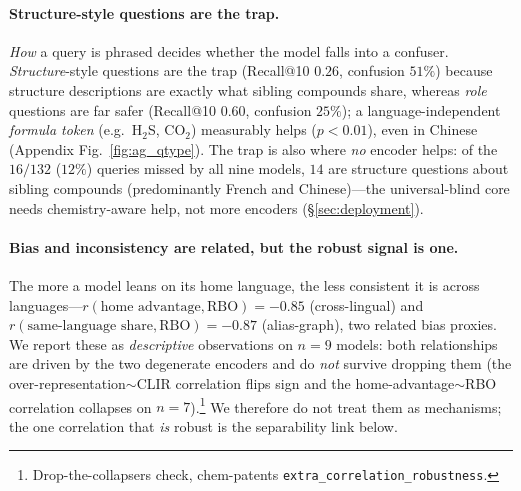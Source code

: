 \documentclass[11pt]{article}
\begin{document}
\paragraph{Structure-style questions are the trap.}
\emph{How} a query is phrased decides whether the model falls into a confuser.
\emph{Structure}-style questions are the trap (Recall@10 $0.26$, confusion
$51\%$) because structure descriptions are exactly what sibling compounds
share, whereas \emph{role} questions are far safer (Recall@10 $0.60$, confusion
$25\%$); a language-independent \emph{formula token} (e.g.\ H$_2$S, CO$_2$)
measurably helps ($p<0.01$), even in Chinese (Appendix Fig.~\ref{fig:ag_qtype}). The
trap is also where \emph{no} encoder helps: of the $16/132$ ($12\%$) queries
missed by all nine models, $14$ are structure questions about sibling compounds
(predominantly French and Chinese)---the universal-blind core needs
chemistry-aware help, not more encoders (\S\ref{sec:deployment}).

\paragraph{Bias and inconsistency are related, but the robust signal is one.}
The more a model leans on its home language, the less consistent it is across
languages---$r(\text{home advantage},\text{RBO})=-0.85$ (cross-lingual) and
$r(\text{same-language share},\text{RBO})=-0.87$ (alias-graph), two related bias
proxies. We report these as \emph{descriptive} observations on $n{=}9$ models:
both relationships are driven by the two degenerate encoders and do \emph{not}
survive dropping them (the over-representation$\sim$CLIR correlation flips sign
and the home-advantage$\sim$RBO correlation collapses on $n{=}7$).\footnote{Drop-the-collapsers
check, chem-patents \texttt{extra\_correlation\_robustness}.} We therefore do not
treat them as mechanisms; the one correlation that \emph{is} robust is the
separability link below.
\end{document}
